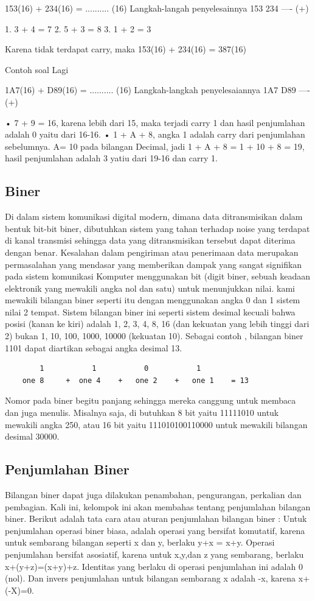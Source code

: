153(16) + 234(16) = .......... (16) 
Langkah-langah penyelesainnya
153 
234 
---- (+)

1. 3 + 4 = 7
2. 5 + 3 = 8
3. 1 + 2 = 3

Karena tidak terdapat carry, maka 153(16) + 234(16) = 387(16)

Contoh soal Lagi 

1A7(16) + D89(16) = .......... (16)
Langkah-langkah penyelesaiannya
1A7
D89
---- (+)

•	7 + 9 = 16, karena lebih dari 15, maka terjadi carry 1 dan hasil penjumlahan adalah 0 yaitu dari 16-16.
•	1 + A + 8, angka 1 adalah carry dari penjumlahan sebelumnya. A= 10 pada bilangan Decimal, jadi 1 + A + 8 = 1 + 10 + 8 = 19, hasil penjumlahan adalah 3 yatiu dari 19-16 dan carry 1.


\subsection {Biner}
Di dalam sistem komunikasi digital modern, dimana data ditransmisikan dalam bentuk bit-bit biner, dibutuhkan sistem yang tahan terhadap noise yang terdapat di kanal transmisi sehingga data yang ditransmisikan tersebut dapat diterima dengan benar. Kesalahan dalam pengiriman atau penerimaan data merupakan permasalahan yang mendasar yang memberikan dampak yang sangat signifikan pada sistem komunikasi
Komputer menggunakan bit (digit biner, sebuah keadaan elektronik yang mewakili angka nol dan satu) untuk menunjukkan nilai. kami mewakili bilangan biner seperti itu dengan menggunakan angka 0 dan 1 sistem nilai 2 tempat. Sistem bilangan biner ini seperti sistem desimal kecuali bahwa posisi (kanan ke kiri) adalah 1, 2, 3, 4, 8, 16 (dan kekuatan yang lebih tinggi dari 2) bukan 1, 10, 100, 1000, 10000 (kekuatan 10). Sebagai contoh , bilangan biner 1101 dapat diartikan sebagai angka desimal 13.
	\begin{verbatim}
		1			1			0			1
	one 8	  +	 one 4	  +	  one 2    +   one 1 	= 13
	\end{verbatim}
Nomor pada  biner begitu panjang sehingga mereka canggung  untuk membaca dan juga menulis. Misalnya saja, di butuhkan 8 bit yaitu  11111010 untuk mewakili angka 250, atau 16 bit yaitu 111010100110000 untuk mewakili bilangan desimal 30000.


\subsection {Penjumlahan Biner}
Bilangan biner dapat juga dilakukan penambahan, pengurangan, perkalian dan pembagian. Kali ini, kelompok ini akan membahas tentang penjumlahan bilangan biner. Berikut adalah tata cara atau aturan penjumlahan bilangan biner :
Untuk penjumlahan operasi biner biasa, adalah operasi yang bersifat komutatif, karena untuk sembarang bilangan seperti x dan y, berlaku y+x = x+y. Operasi penjumlahan bersifat asosiatif, karena untuk x,y,dan z yang sembarang, berlaku x+(y+z)=(x+y)+z. Identitas yang berlaku di operasi penjumlahan ini adalah 0 (nol). Dan invers penjumlahan untuk bilangan sembarang x adalah -x, karena x+(-X)=0.

